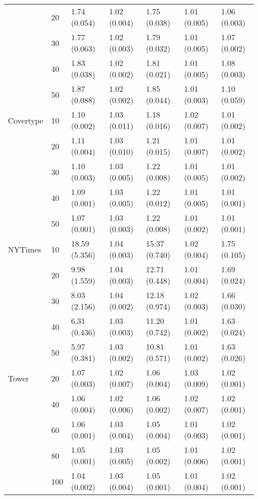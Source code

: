 \begin{table}[ht]
\begin{tabular}{lllllll}
      & 20  &   1.74 (0.054) &   1.02 (0.004) &   1.75 (0.038) &         1.01 (0.005) &  1.06 (0.003) \\
      & 30  &   1.77 (0.063) &   1.02 (0.003) &   1.79 (0.032) &         1.01 (0.005) &  1.07 (0.002) \\
      & 40  &   1.83 (0.038) &   1.02 (0.002) &   1.81 (0.021) &         1.01 (0.005) &  1.08 (0.003) \\
      & 50  &   1.87 (0.088) &   1.02 (0.002) &   1.85 (0.044) &         1.01 (0.003) &  1.10 (0.059) \\
\midrule
Covertype & 10  &   1.10 (0.002) &   1.03 (0.011) &   1.18 (0.016) &         1.02 (0.007) &  1.01 (0.002) \\
      & 20  &   1.11 (0.004) &   1.03 (0.010) &   1.21 (0.015) &         1.01 (0.007) &  1.01 (0.002) \\
      & 30  &   1.10 (0.003) &   1.03 (0.005) &   1.22 (0.008) &         1.01 (0.005) &  1.01 (0.002) \\
      & 40  &   1.09 (0.001) &   1.03 (0.005) &   1.22 (0.012) &         1.01 (0.005) &  1.01 (0.001) \\
      & 50  &   1.07 (0.001) &   1.03 (0.003) &   1.22 (0.008) &         1.01 (0.002) &  1.01 (0.001) \\
\midrule
NYTimes & 10  &  18.59 (5.356) &   1.04 (0.003) &  15.37 (0.740) &         1.02 (0.004) &  1.75 (0.105) \\
      & 20  &   9.98 (1.559) &   1.04 (0.003) &  12.71 (0.448) &         1.01 (0.004) &  1.69 (0.024) \\
      & 30  &   8.03 (2.156) &   1.04 (0.002) &  12.18 (0.974) &         1.02 (0.003) &  1.66 (0.030) \\
      & 40  &   6.31 (0.436) &   1.03 (0.003) &  11.20 (0.742) &         1.01 (0.002) &  1.63 (0.024) \\
      & 50  &   5.97 (0.381) &   1.03 (0.002) &  10.81 (0.571) &         1.01 (0.002) &  1.63 (0.026) \\
\midrule
Tower & 20  &   1.07 (0.003) &   1.02 (0.007) &   1.06 (0.004) &         1.03 (0.009) &  1.02 (0.001) \\
      & 40  &   1.06 (0.004) &   1.02 (0.006) &   1.06 (0.002) &         1.02 (0.007) &  1.02 (0.001) \\
      & 60  &   1.06 (0.001) &   1.03 (0.004) &   1.05 (0.004) &         1.01 (0.003) &  1.02 (0.001) \\
      & 80  &   1.05 (0.001) &   1.03 (0.005) &   1.05 (0.002) &         1.01 (0.006) &  1.02 (0.001) \\
      & 100 &   1.04 (0.002) &   1.03 (0.004) &   1.05 (0.001) &         1.01 (0.004) &  1.02 (0.001) \\
\bottomrule
\end{tabular}

\end{table}




